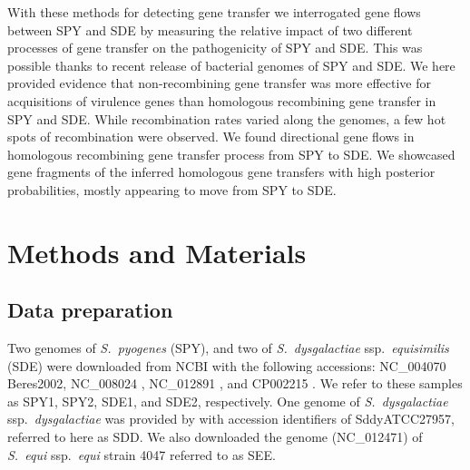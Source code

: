 \documentclass[english]{article}
\begin{document}
With these
methods for detecting gene transfer we interrogated gene flows
between SPY and SDE by measuring the relative impact of
two different processes of gene transfer on the pathogenicity of SPY
and SDE. This was possible thanks to recent release of bacterial
genomes of SPY and SDE. 
We here provided evidence that non-recombining
gene transfer was more effective for acquisitions of virulence genes
than homologous recombining gene transfer in SPY and SDE. 
While recombination rates varied along
the genomes, a few hot spots of recombination were observed. We found
directional gene flows in homologous recombining gene transfer process from SPY
to SDE. 
We showcased gene fragments of the inferred homologous gene transfers with high
posterior probabilities, mostly appearing to move from SPY to SDE. 

\clearpage{}


\section{Methods and Materials}

\subsection{Data preparation}
Two genomes of \emph{S.\ pyogenes} (SPY), and two of \emph{S.\ dysgalactiae}
ssp.\emph{\ equisimilis} (SDE) were downloaded from NCBI with the following 
accessions:
NC\_004070 {Beres2002}, NC\_008024 \citep{Beres2006}, NC\_012891
\citep{Shimomura2011}, and CP002215 \citep{Suzuki2011}. We refer to these 
samples as SPY1, SPY2, SDE1, and SDE2, respectively. One genome
of \emph{S.\ dysgalactiae} 
ssp.\emph{\ dysgalactiae} was provided
by \citet{Suzuki2011} with accession identifiers of SddyATCC27957, referred to 
here as SDD. We also downloaded the genome (NC\_012471) of 
\emph{S.\ equi} ssp.\emph{\ equi} strain 4047 referred to as SEE.
\end{document}
